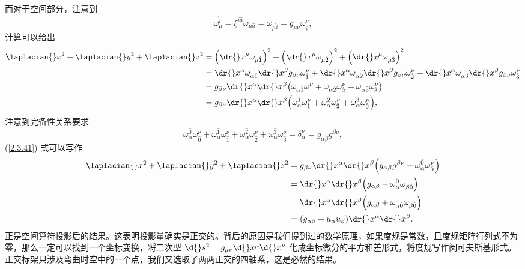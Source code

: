 \documentclass[UTF8, 12pt, a4paper, oneside, onecolumn, fontset=none]{ctexart}
\begin{document}
而对于空间部分，注意到
\begin{equation}
\omega_{\mu}^{\hat{i}}=\xi^{\hat{i}\hat{a}}\omega_{\mu\hat{a}}=\omega_{\mu\hat{i}}=g_{\mu\nu}\omega^{\nu}_{\hat{i}},
\end{equation}
计算可以给出
\begin{align}
\laplacian{}x^{2}+\laplacian{}y^{2}+\laplacian{}z^{2}&=\mleft(\dr{}x^{\mu}\omega_{\mu\hat{1}}\mright)^{2}+\mleft(\dr{}x^{\mu}\omega_{\mu\hat{2}}\mright)^{2}+\mleft(\dr{}x^{\mu}\omega_{\mu\hat{3}}\mright)^{2}\notag\\
&=\dr{}x^{\alpha}\omega_{\alpha\hat{1}}\dr{}x^{\beta}g_{\beta\nu}\omega^{\nu}_{\hat{1}}+\dr{}x^{\alpha}\omega_{\alpha\hat{2}}\dr{}x^{\beta}g_{\beta\nu}\omega^{\nu}_{\hat{2}}+\dr{}x^{\alpha}\omega_{\alpha\hat{3}}\dr{}x^{\beta}g_{\beta\nu}\omega^{\nu}_{\hat{3}}\notag\\
&=g_{\beta\nu}\dr{}x^{\alpha}\dr{}x^{\beta}\mleft(\omega_{\alpha\hat{1}}\omega^{\nu}_{\hat{1}}+\omega_{\alpha\hat{2}}\omega^{\nu}_{\hat{2}}+\omega_{\alpha\hat{3}}\omega^{\nu}_{\hat{3}}\mright)\notag\\
&=g_{\beta\nu}\dr{}x^{\alpha}\dr{}x^{\beta}\mleft(\omega_{\alpha}^{\hat{1}}\omega^{\nu}_{\hat{1}}+\omega_{\alpha}^{\hat{2}}\omega^{\nu}_{\hat{2}}+\omega_{\alpha}^{\hat{3}}\omega^{\nu}_{\hat{3}}\mright),\label{2.3.41}
\end{align}
注意到完备性关系要求
\begin{equation}
\omega_{\alpha}^{\hat{0}}\omega^{\nu}_{\hat{0}}+\omega_{\alpha}^{\hat{1}}\omega^{\nu}_{\hat{1}}+\omega_{\alpha}^{\hat{2}}\omega^{\nu}_{\hat{2}}+\omega_{\alpha}^{\hat{3}}\omega^{\nu}_{\hat{3}}=\delta^{\nu}_{\alpha}=g_{\alpha\beta}g^{\beta\nu},
\end{equation}
(\ref{2.3.41}) 式可以写作
\begin{align}
\laplacian{}x^{2}+\laplacian{}y^{2}+\laplacian{}z^{2}&=g_{\beta\nu}\dr{}x^{\alpha}\dr{}x^{\beta}\mleft(g_{\alpha\beta}g^{\beta\nu}-\omega_{\alpha}^{\hat{0}}\omega^{\nu}_{\hat{0}}\mright)\notag\\
&=\dr{}x^{\alpha}\dr{}x^{\beta}\mleft(g_{\alpha\beta}-\omega^{\hat{0}}_{\alpha}\omega_{\beta\hat{0}}\mright)\notag\\
&=\dr{}x^{\alpha}\dr{}x^{\beta}\mleft(g_{\alpha\beta}+\omega_{\alpha\hat{0}}\omega_{\beta\hat{0}}\mright)\notag\\
&=\mleft(g_{\alpha\beta}+u_{\alpha}u_{\beta}\mright)\dr{}x^{\alpha}\dr{}x^{\beta}.
\end{align}
正是空间算符投影后的结果。这表明投影量确实是正交的。背后的原因是我们提到过的数学原理，如果度规是常数，且度规矩阵行列式不为零，那么一定可以找到一个坐标变换，将二次型 $\d{}s^{2}=g_{\mu\nu}\d{}x^{\mu}\d{}x^{\nu}$ 化成坐标微分的平方和差形式，将度规写作闵可夫斯基形式。正交标架只涉及弯曲时空中的一个点，我们又选取了两两正交的四轴系，这是必然的结果。
\end{document}
